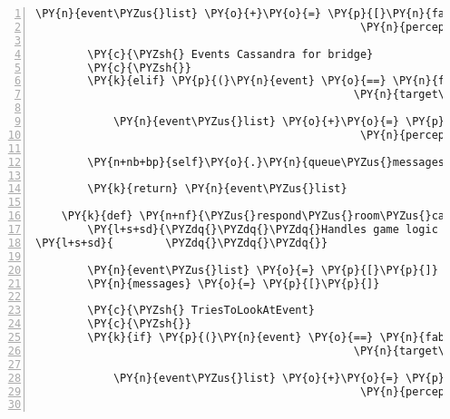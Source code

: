 \begin{Verbatim}[commandchars=\\\{\},numbers=left,firstnumber=1,stepnumber=1]
            \PY{n}{event\PYZus{}list} \PY{o}{+}\PY{o}{=} \PY{p}{[}\PY{n}{fabula}\PY{o}{.}\PY{n}{PerceptionEvent}\PY{p}{(}\PY{n}{identifier}\PY{o}{=}\PY{n}{ID\PYZus{}CASSANDRA}\PY{p}{,}
                                                  \PY{n}{perception}\PY{o}{=}\PY{l+s}{\PYZsq{}}\PY{l+s}{Brücke gesperrt! Betreten verboten, Überfliegen erlaubt}\PY{l+s}{\PYZsq{}}\PY{p}{)}\PY{p}{]}

        \PY{c}{\PYZsh{} Events Cassandra for bridge}
        \PY{c}{\PYZsh{}}
        \PY{k}{elif} \PY{p}{(}\PY{n}{event} \PY{o}{==} \PY{n}{fabula}\PY{o}{.}\PY{n}{TriesToLookAtEvent}\PY{p}{(}\PY{n}{identifier}\PY{o}{=}\PY{n}{ID\PYZus{}CASSANDRA}\PY{p}{,}
                                                 \PY{n}{target\PYZus{}identifier}\PY{o}{=}\PY{l+s}{\PYZsq{}}\PY{l+s}{bridge}\PY{l+s}{\PYZsq{}}\PY{p}{)}\PY{p}{)}\PY{p}{:}

            \PY{n}{event\PYZus{}list} \PY{o}{+}\PY{o}{=} \PY{p}{[}\PY{n}{fabula}\PY{o}{.}\PY{n}{PerceptionEvent}\PY{p}{(}\PY{n}{identifier}\PY{o}{=}\PY{n}{ID\PYZus{}CASSANDRA}\PY{p}{,}
                                                  \PY{n}{perception}\PY{o}{=}\PY{l+s}{\PYZsq{}}\PY{l+s}{Abflugsort über die Brücke.}\PY{l+s}{\PYZsq{}}\PY{p}{)}\PY{p}{]}

        \PY{n+nb+bp}{self}\PY{o}{.}\PY{n}{queue\PYZus{}messages}\PY{p}{(}\PY{o}{*}\PY{n}{messages}\PY{p}{)}

        \PY{k}{return} \PY{n}{event\PYZus{}list}

    \PY{k}{def} \PY{n+nf}{\PYZus{}respond\PYZus{}room\PYZus{}cassandra}\PY{p}{(}\PY{n+nb+bp}{self}\PY{p}{,} \PY{n}{event}\PY{p}{,} \PY{n}{room}\PY{p}{)}\PY{p}{:}
        \PY{l+s+sd}{\PYZdq{}\PYZdq{}\PYZdq{}Handles game logic for room cassandra.}
\PY{l+s+sd}{        \PYZdq{}\PYZdq{}\PYZdq{}}

        \PY{n}{event\PYZus{}list} \PY{o}{=} \PY{p}{[}\PY{p}{]}
        \PY{n}{messages} \PY{o}{=} \PY{p}{[}\PY{p}{]}

        \PY{c}{\PYZsh{} TriesToLookAtEvent}
        \PY{c}{\PYZsh{}}
        \PY{k}{if} \PY{p}{(}\PY{n}{event} \PY{o}{==} \PY{n}{fabula}\PY{o}{.}\PY{n}{TriesToLookAtEvent}\PY{p}{(}\PY{n}{identifier}\PY{o}{=}\PY{n}{ID\PYZus{}CASSANDRA}\PY{p}{,}
                                                 \PY{n}{target\PYZus{}identifier}\PY{o}{=}\PY{l+s}{\PYZsq{}}\PY{l+s}{box}\PY{l+s}{\PYZsq{}}\PY{p}{)}\PY{p}{)}\PY{p}{:}

            \PY{n}{event\PYZus{}list} \PY{o}{+}\PY{o}{=} \PY{p}{[}\PY{n}{fabula}\PY{o}{.}\PY{n}{PerceptionEvent}\PY{p}{(}\PY{n}{identifier}\PY{o}{=}\PY{n}{ID\PYZus{}CASSANDRA}\PY{p}{,}
                                                  \PY{n}{perception}\PY{o}{=}\PY{l+s}{\PYZsq{}}\PY{l+s}{Eine Kiste, leider lässt sie sich nicht öffnen.}\PY{l+s}{\PYZsq{}}\PY{p}{)}\PY{p}{]}


\end{Verbatim}
